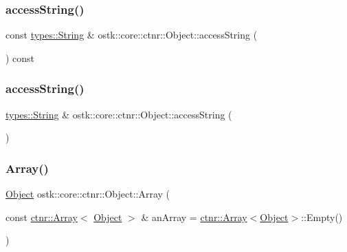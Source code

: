 \mbox{\label{classostk_1_1core_1_1ctnr_1_1_object_a3c4bed636918ab8fc9a04e3b4bdebfe6}} 
\subsubsection{\texorpdfstring{access\+String()}{accessString()}\hspace{0.1cm}{\footnotesize\ttfamily [1/2]}}
{\footnotesize\ttfamily const \hyperlink{classostk_1_1core_1_1types_1_1_string}{types\+::\+String} \& ostk\+::core\+::ctnr\+::\+Object\+::access\+String (\begin{DoxyParamCaption}{ }\end{DoxyParamCaption}) const}

\mbox{\label{classostk_1_1core_1_1ctnr_1_1_object_a746ad17230f6fb78aab896dce307b5d6}} 
\subsubsection{\texorpdfstring{access\+String()}{accessString()}\hspace{0.1cm}{\footnotesize\ttfamily [2/2]}}
{\footnotesize\ttfamily \hyperlink{classostk_1_1core_1_1types_1_1_string}{types\+::\+String} \& ostk\+::core\+::ctnr\+::\+Object\+::access\+String (\begin{DoxyParamCaption}{ }\end{DoxyParamCaption})}

\mbox{\label{classostk_1_1core_1_1ctnr_1_1_object_a036acaa54d365a2cdf3227f96ea8344b}} 
\subsubsection{\texorpdfstring{Array()}{Array()}}
{\footnotesize\ttfamily \hyperlink{classostk_1_1core_1_1ctnr_1_1_object}{Object} ostk\+::core\+::ctnr\+::\+Object\+::\+Array (\begin{DoxyParamCaption}\item[{const \hyperlink{classostk_1_1core_1_1ctnr_1_1_array}{ctnr\+::\+Array}$<$ \hyperlink{classostk_1_1core_1_1ctnr_1_1_object}{Object} $>$ \&}]{an\+Array = {\ttfamily \hyperlink{classostk_1_1core_1_1ctnr_1_1_array}{ctnr\+::\+Array}$<$\hyperlink{classostk_1_1core_1_1ctnr_1_1_object}{Object}$>$\+:\+:Empty()} }\end{DoxyParamCaption})\hspace{0.3cm}{\ttfamily [static]}}


